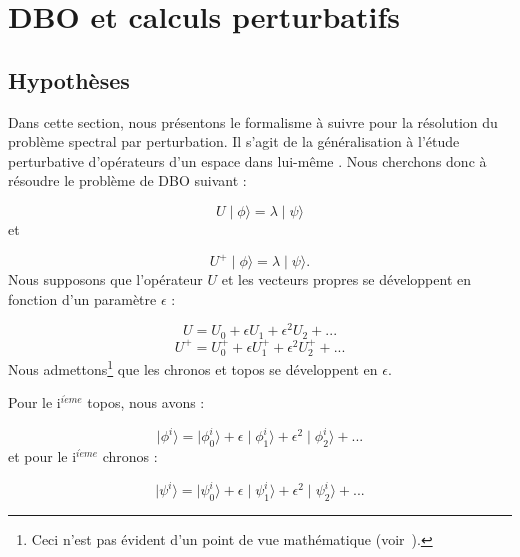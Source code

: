 \documentclass{book}
\begin{document}
\section{DBO et calculs perturbatifs}\label{sectionpertu}
\subsection{Hypoth\`eses}
Dans cette section, nous pr\'esentons le formalisme
\`a suivre pour la r\'esolution du probl\`eme spectral
par perturbation.
Il s'agit de la g\'en\'eralisation \`a l'\'etude perturbative
d'op\'erateurs d'un espace dans lui-m\^eme \cite{Kato66}.
Nous cherchons donc \`a r\'esoudre le probl\`eme de DBO suivant :

\begin{equation} U\mid  \phi \rangle  = \lambda\mid  \psi \rangle \label{DBO}\end{equation}
et

\begin{equation} U^{+}\mid  \phi \rangle  = \lambda\mid  \psi \rangle. \label{DBO+}
\end{equation}
Nous supposons que l'op\'erateur $U$ et les vecteurs
propres se d\'eveloppent en fonction d'un param\`etre $\epsilon$ :


\begin{equation} U=U_{0}+\epsilon U_{1}+\epsilon ^{2}U_2+...\end{equation}
\begin{equation} U^+=U_{0}^++\epsilon U_{1}^++\epsilon ^{2}U_{2}^++...\end{equation}
Nous admettons\footnote{Ceci n'est pas \'evident d'un point de vue
math\'ematique (voir~\cite{Kato66}).} que les chronos et topos se 
d\'eveloppent en $\epsilon$.

Pour le i$^{i\grave eme}$ topos, nous avons :

\begin{equation} \mid \phi^{i}\rangle =\mid \phi^{i}_{0}\rangle +\epsilon
\mid \phi^{i}_{1}\rangle +\epsilon^{2}\mid \phi^{i}_{2}\rangle +...
\label{hyph}\end{equation} 
et pour le i$^{i\grave eme}$ chronos  :

\begin{equation} \mid \psi^{i}\rangle =\mid \psi^{i}_{0}\rangle +\epsilon
\mid \psi^{i}_{1}\rangle +\epsilon^{2}\mid \psi^{i}_{2}\rangle +...
\label{hyps}\end{equation} 
\end{document}
